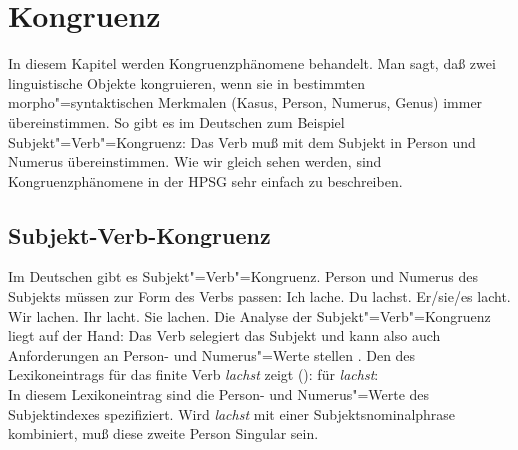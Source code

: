 

\chapter{Kongruenz}
\label{chap-kongruenz}

In diesem Kapitel werden Kongruenzphänomene behandelt. Man sagt, daß zwei linguistische
Objekte kongruieren, wenn sie in bestimmten morpho"=syntaktischen Merkmalen (\zb Kasus,
Person, Numerus, Genus) immer übereinstimmen.
So gibt es im Deutschen zum Beispiel Subjekt"=Verb"=Kongruenz: 
Das Verb muß mit dem Subjekt in Person und Numerus übereinstimmen.
Wie wir gleich sehen werden, sind Kongruenzphänomene in der HPSG sehr einfach
zu beschreiben.

\section{Subjekt-Verb-Kongruenz}

Im Deutschen gibt es Subjekt"=Verb"=Kongruenz. Person und Numerus des Subjekts
müssen zur Form des Verbs passen:
\eal
\ex Ich lache.
\ex Du lachst.
\ex Er/sie/es lacht.
\ex Wir lachen.
\ex Ihr lacht.
\ex Sie lachen.
\zl
Die Analyse der Subjekt"=Verb"=Kongruenz liegt auf der Hand: Das Verb selegiert
das Subjekt und kann also auch Anforderungen an Person- und Numerus"=Werte stellen \citep[]{ps2}.
Den \localw des Lexikoneintrags für das finite Verb \emph{lachst} zeigt ():
\ea
\localw für \emph{lachst}:\\
\z
In diesem Lexikoneintrag sind die Person- und Numerus"=Werte des Subjektindexes 
spezifiziert. Wird \emph{lachst} mit einer Subjektsnominalphrase kombiniert, muß diese zweite Person Singular
sein.

